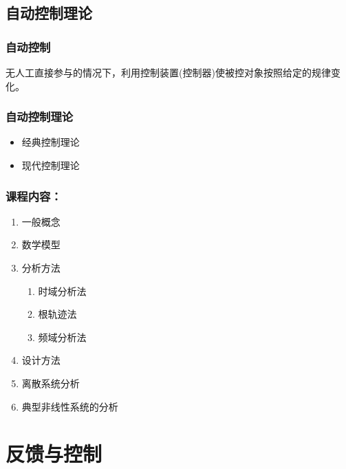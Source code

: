 \documentclass{article}
\begin{document}
\subsection{自动控制理论}
\label{sec-1-2}
\begin{frame}
\frametitle{自动控制}
\label{sec-1-2-1}

 无人工直接参与的情况下，利用控制装置(控制器)使被控对象按照给定的规律变化。
\end{frame}
\begin{frame}
\frametitle{自动控制理论}
\label{sec-1-2-2}

\begin{itemize}
\item <2->经典控制理论
\item <3->现代控制理论
\end{itemize}
\end{frame}
\begin{frame}
\frametitle{课程内容：}
\label{sec-1-2-3}

\begin{enumerate}
\item <2->一般概念
\item <3->数学模型
\item <4->分析方法
\begin{enumerate}
\item 时域分析法
\item 根轨迹法
\item 频域分析法
\end{enumerate}
\item <5->设计方法
\item <6->离散系统分析
\item <7->典型非线性系统的分析
\end{enumerate}
\end{frame}
\section{反馈与控制}
\label{sec-2}
\end{document}
